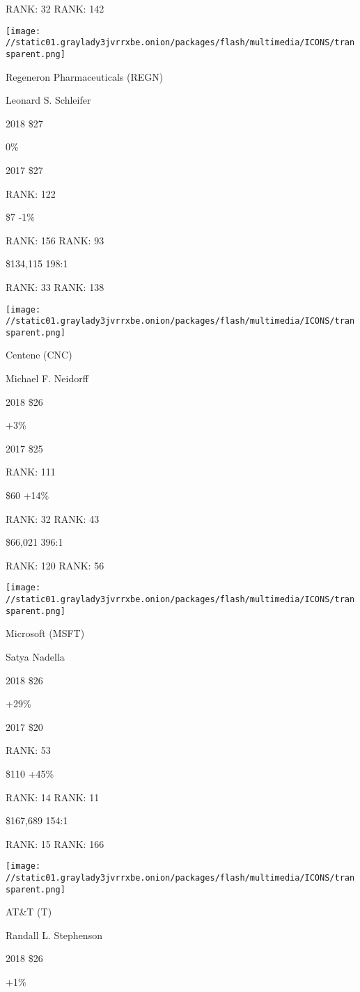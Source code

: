 RANK: 32 RANK: 142

\texttt{[image: //static01.graylady3jvrrxbe.onion/packages/flash/multimedia/ICONS/transparent.png]}

Regeneron Pharmaceuticals (REGN)

Leonard S. Schleifer \protect\hyperlink{g-footnotes}{}

2018 \$27

 0\%

2017 \$27

RANK: 122

 \$7 -1\%

RANK: 156 RANK: 93

 \$134,115 198:1

RANK: 33 RANK: 138

\texttt{[image: //static01.graylady3jvrrxbe.onion/packages/flash/multimedia/ICONS/transparent.png]}

Centene (CNC)

Michael F. Neidorff \protect\hyperlink{g-footnotes}{}

2018 \$26

 +3\%

2017 \$25

RANK: 111

 \$60 +14\%

RANK: 32 RANK: 43

 \$66,021 396:1

RANK: 120 RANK: 56

\texttt{[image: //static01.graylady3jvrrxbe.onion/packages/flash/multimedia/ICONS/transparent.png]}

Microsoft (MSFT)

Satya Nadella \protect\hyperlink{g-footnotes}{}

2018 \$26

 +29\%

2017 \$20

RANK: 53

 \$110 +45\%

RANK: 14 RANK: 11

 \$167,689 154:1

RANK: 15 RANK: 166

\texttt{[image: //static01.graylady3jvrrxbe.onion/packages/flash/multimedia/ICONS/transparent.png]}

AT\&T (T)

Randall L. Stephenson \protect\hyperlink{g-footnotes}{}

2018 \$26

 +1\%

